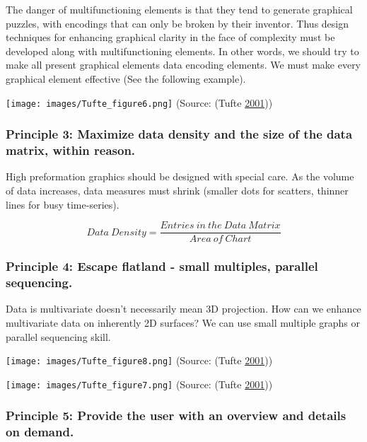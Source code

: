 \documentclass[]{book}
\begin{document}
The danger of multifunctioning elements is that they tend to generate graphical puzzles, with encodings that can only be broken by their inventor. Thus design techniques for enhancing graphical clarity in the face of complexity must be developed along with multifunctioning elements. In other words, we should try to make all present graphical elements data encoding elements. We must make every graphical element effective (See the following example).

\texttt{[image: images/Tufte\_figure6.png]}
(Source: (Tufte \protect\hyperlink{ref-Tufte_2001}{2001}))

\hypertarget{principle-3-maximize-data-density-and-the-size-of-the-data-matrix-within-reason.}{%
\subsubsection{Principle 3: Maximize data density and the size of the data matrix, within reason.}\label{principle-3-maximize-data-density-and-the-size-of-the-data-matrix-within-reason.}}

High preformation graphics should be designed with special care. As the volume of data increases, data measures must shrink (smaller dots for scatters, thinner lines for busy time-series).

\[{Data \ Density} = \frac{{Entries \ in \ the \ Data \ Matrix}}{{Area \ of \ Chart}}\]

\hypertarget{principle-4-escape-flatland---small-multiples-parallel-sequencing.}{%
\subsubsection{Principle 4: Escape flatland - small multiples, parallel sequencing.}\label{principle-4-escape-flatland---small-multiples-parallel-sequencing.}}

Data is multivariate doesn't necessarily mean 3D projection. How can we enhance multivariate data on inherently 2D surfaces? We can use small multiple graphs or parallel sequencing skill.

\texttt{[image: images/Tufte\_figure8.png]}
(Source: (Tufte \protect\hyperlink{ref-Tufte_2001}{2001}))

\texttt{[image: images/Tufte\_figure7.png]}
(Source: (Tufte \protect\hyperlink{ref-Tufte_2001}{2001}))

\hypertarget{principle-5-provide-the-user-with-an-overview-and-details-on-demand.}{%
\subsubsection{Principle 5: Provide the user with an overview and details on demand.}\label{principle-5-provide-the-user-with-an-overview-and-details-on-demand.}}
\end{document}
